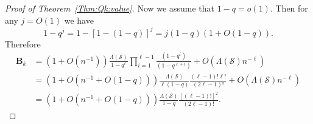 \documentclass[10pt,a4paper]{amsart}
\newcommand{\bB}{\mathbf{B}}
\newcommand{\cS}{\mathcal{S}}
\newcommand{\productO}{\Lambda(\cS)}
\begin{document}
\begin{proof}[Proof of Theorem~\ref{Thm:Qk:value}]
	Now we assume that $1-q=o(1)$. Then for any $j=O(1)$ we have
	\[
	1-q^j=1-[1-(1-q)]^j=j(1-q)(1+O(1-q)).
	\]
	Therefore
	\begin{align}\nonumber
		\bB_{k}
		&=(1+O(n^{-1}))\frac{\productO}{1-q^\ell}\prod_{i=1}^{\ell-1}\frac{(1-q^i)}{(1-q^{\ell+i})}+O(\productO n^{-\ell})\\	\nonumber		&=(1+O(n^{-1}+O(1-q)))\frac{\productO}{\ell(1-q)}\frac{(\ell-1)!\ell!}{(2\ell-1)!}+O(\productO n^{-\ell})\\
		\label{Eq:q:tendsto1}			&=(1+O(n^{-1}+O(1-q)))\frac{\productO}{1-q}\frac{[(\ell-1)!]^2}{(2\ell-1)!}.
	\end{align}
\end{proof}
\end{document}
